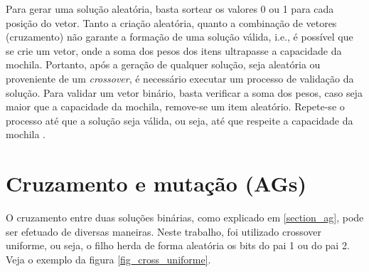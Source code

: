 Para gerar uma solução aleatória, basta sortear os valores 0 ou 1 para cada posição do vetor. Tanto a criação aleatória, quanto a combinação de vetores (cruzamento) não garante a formação de uma solução válida, i.e., é possível que se crie um vetor, onde a soma dos pesos dos itens ultrapasse a capacidade da mochila. Portanto, após a geração de qualquer solução, seja aleatória ou proveniente de um \textit{crossover}, é necessário executar um processo de validação da solução. Para validar um vetor binário, basta verificar a soma dos pesos, caso seja maior que a capacidade da mochila, remove-se um item aleatório. Repete-se o processo até que a solução seja válida, ou seja, até que respeite a capacidade da mochila \cite{Ishibuchi2015}.

\section{Cruzamento e mutação (AGs)}
O cruzamento entre duas soluções binárias, como explicado em \ref{section_ag}, pode ser efetuado de diversas maneiras. Neste trabalho, foi utilizado crossover uniforme, ou seja, o filho herda de forma aleatória os bits do pai 1 ou do pai 2. Veja o exemplo da figura \ref{fig_cross_uniforme}.

